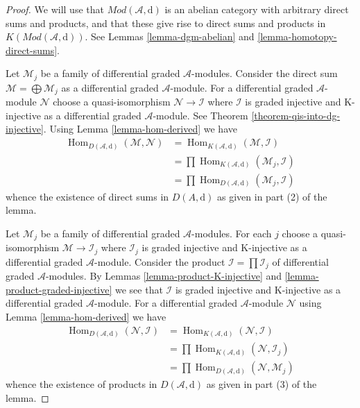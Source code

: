 \documentclass[10pt,a4paper]{amsart}
\theoremstyle{plain}
\theoremstyle{definition}
\theoremstyle{remark}
\numberwithin{equation}{subsection}
\def\Hom{\mathop{\mathrm{Hom}}\nolimits}
\begin{document}
\begin{proof}
We will use that $\textit{Mod}(\mathcal{A}, \text{d})$ is an abelian category
with arbitrary direct sums and products, and that these give rise
to direct sums and products in $K(\textit{Mod}(\mathcal{A}, \text{d}))$.
See Lemmas \ref{lemma-dgm-abelian} and \ref{lemma-homotopy-direct-sums}.

\medskip\noindent
Let $\mathcal{M}_j$ be a family of differential graded $\mathcal{A}$-modules.
Consider the direct sum $\mathcal{M} = \bigoplus \mathcal{M}_j$
as a differential graded $\mathcal{A}$-module.
For a differential graded $\mathcal{A}$-module
$\mathcal{N}$ choose a quasi-isomorphism
$\mathcal{N} \to \mathcal{I}$ where
$\mathcal{I}$ is graded injective and K-injective as a
differential graded $\mathcal{A}$-module. See
Theorem \ref{theorem-qis-into-dg-injective}.
Using Lemma \ref{lemma-hom-derived} we have
\begin{align*}
\Hom_{D(\mathcal{A}, \text{d})}(\mathcal{M}, \mathcal{N})
& =
\Hom_{K(\mathcal{A}, \text{d})}(\mathcal{M}, \mathcal{I}) \\
& =
\prod \Hom_{K(\mathcal{A}, \text{d})}(\mathcal{M}_j, \mathcal{I}) \\
& =
\prod \Hom_{D(\mathcal{A}, \text{d})}(\mathcal{M}_j, \mathcal{I})
\end{align*}
whence the existence of direct sums in $D(A, \text{d})$ as given in
part (2) of the lemma.

\medskip\noindent
Let $\mathcal{M}_j$ be a family of differential graded $\mathcal{A}$-modules.
For each $j$ choose a quasi-isomorphism
$\mathcal{M} \to \mathcal{I}_j$ where
$\mathcal{I}_j$ is graded injective and K-injective as a
differential graded $\mathcal{A}$-module.
Consider the product $\mathcal{I} = \prod \mathcal{I}_j$
of differential graded $\mathcal{A}$-modules.
By Lemmas \ref{lemma-product-K-injective} and
\ref{lemma-product-graded-injective} we see that
$\mathcal{I}$ is graded injective and K-injective as a
differential graded $\mathcal{A}$-module.
For a differential graded $\mathcal{A}$-module
$\mathcal{N}$ using Lemma \ref{lemma-hom-derived} we have
\begin{align*}
\Hom_{D(\mathcal{A}, \text{d})}(\mathcal{N}, \mathcal{I})
& =
\Hom_{K(\mathcal{A}, \text{d})}(\mathcal{N}, \mathcal{I}) \\
& =
\prod \Hom_{K(\mathcal{A}, \text{d})}(\mathcal{N}, \mathcal{I}_j) \\
& =
\prod \Hom_{D(\mathcal{A}, \text{d})}(\mathcal{N}, \mathcal{M}_j)
\end{align*}
whence the existence of products in $D(\mathcal{A}, \text{d})$ as given in
part (3) of the lemma.
\end{proof}
\end{document}
